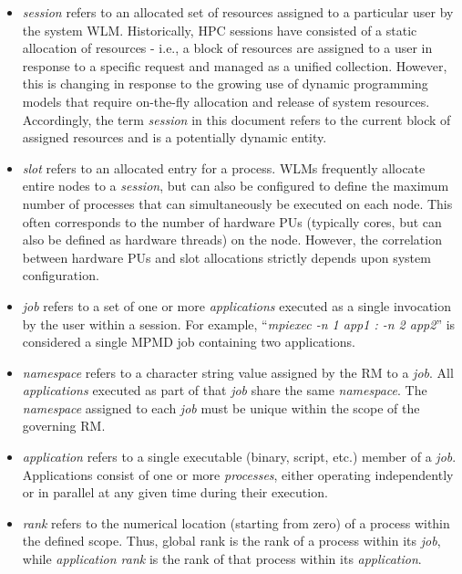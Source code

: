 \begin{itemize}
\item {}\emph{session} refers to an allocated set of resources assigned to a particular user by the system \ac{WLM}. Historically, \ac{HPC} sessions have consisted of a static allocation of resources - i.e., a block of resources are assigned to a user in response to a specific request and managed as a unified collection. However, this is changing in response to the growing use of dynamic programming models that require on-the-fly allocation and release of system resources. Accordingly, the term \emph{session} in this document refers to the current block of assigned resources and is a potentially dynamic entity.
\item {}\emph{slot} refers to an allocated entry for a process. \acp{WLM} frequently allocate entire nodes to a \emph{session}, but can also be configured to define the maximum number of processes that can simultaneously be executed on each node. This often corresponds to the number of hardware \acp{PU} (typically cores, but can also be defined as hardware threads) on the node. However, the correlation between hardware \acp{PU} and slot allocations strictly depends upon system configuration.
\item {}\emph{job} refers to a set of one or more \emph{applications} executed as a single invocation by the user within a session. For example, ``\textit{mpiexec -n 1 app1 : -n 2 app2}'' is considered a single \ac{MPMD} job containing two applications.
\item {}\emph{namespace} refers to a character string value assigned by the \ac{RM} to a \textit{job}. All \textit{applications} executed as part of that \textit{job} share the same \emph{namespace}. The \emph{namespace} assigned to each \emph{job} must be unique within the scope of the governing \ac{RM}.
\item {}\emph{application} refers to a single executable (binary, script, etc.) member of a \emph{job}. Applications consist of one or more \emph{processes}, either operating independently or in parallel at any given time during their execution.
\item {}\emph{rank} refers to the numerical location (starting from zero) of a process within the defined scope. Thus, {global rank} is the rank of a process within its \emph{job}, while \emph{application rank} is the rank of that process within its \emph{application}.

\end{itemize}
